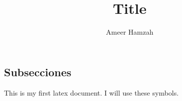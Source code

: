 \documentclass[12pt]{article}
\title{Title}
\author{Ameer Hamzah}
\begin{document}
\maketitle

\section{}
\subsection{Subsecciones}

This is my first latex document.
I will use these symbols.
\end{document}
